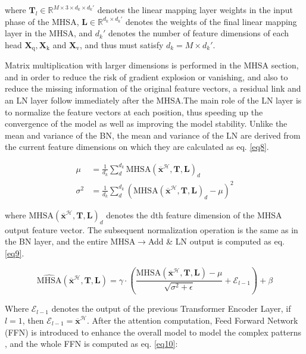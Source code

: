 where $\mathbf{T}_l \in \mathbb{R}^{M\times 3\times d_k\times d_k' }$ denotes the linear mapping layer weights in the input phase of the MHSA, $\mathbf{L} \in \mathbb{R}^{d_k\times d_k' }$ denotes the weights of the final linear mapping layer in the MHSA, and $d_k'$ denotes the number of feature dimensions of each head $\boldsymbol{X}_\text{q}, \boldsymbol{X}_\text{k}$ and $\boldsymbol{X}_\text{v}$, and thus must satisfy $d_k=M\times d_k'$.

Matrix multiplication with larger dimensions is performed in the MHSA section, and in order to reduce the risk of gradient explosion or vanishing, and also to reduce the missing information of the original feature vectors, a residual link and an LN layer follow immediately after the MHSA.The main role of the LN layer is to normalize the feature vectors at each position, thus speeding up the convergence of the model as well as improving the model stability. Unlike the mean and variance of the BN, the mean and variance of the LN are derived from the current feature dimensions on which they are calculated as eq. \ref{eq8}.

\begin{equation}
\label{eq8}
\begin{aligned}
  \mu &= \frac{1}{d_k}\sum^{d_k}_d \text{MHSA}(\overline{\boldsymbol{x}}^\mathcal{H}, \mathbf{T}, \mathbf{L})_d \\
  \sigma^2 &= \frac{1}{d_k}\sum^{d_k}_d \left( \text{MHSA}(\overline{\boldsymbol{x}}^\mathcal{H}, \mathbf{T}, \mathbf{L})_d - \mu \right)^2
\end{aligned}
\end{equation}

where $\text{MHSA}(\overline{\boldsymbol{x}}^\mathcal{H},\mathbf{T},\mathbf{L})_d$ denotes the dth feature dimension of the MHSA output feature vector. The subsequent normalization operation is the same as in the BN layer, and the entire MHSA$\to$Add \& LN output is computed as eq. \ref{eq9}.

\begin{equation}
\label{eq9}
  \hat{\text{MHSA}}(\overline{\boldsymbol{x}}^\mathcal{H}, \mathbf{T}, \mathbf{L}) = \gamma \cdot \left( \frac{\text{MHSA}(\overline{\boldsymbol{x}}^\mathcal{H}, \mathbf{T}, \mathbf{L}) - \mu}{\sqrt{\sigma^2+\epsilon}} + \mathcal{E}_{l-1} \right) + \beta
\end{equation}

Where $\mathcal{E}_{l-1}$ denotes the output of the previous Transformer Encoder Layer, if $l=1$, then $\mathcal{E}_{l-1}=\overline{\boldsymbol{x}}^\mathcal{H}$. After the attention computation, Feed Forward Network (FFN) is introduced to enhance the overall model to model the complex patterns \cite{8}, and the whole FFN is computed as eq. \ref{eq10}:

